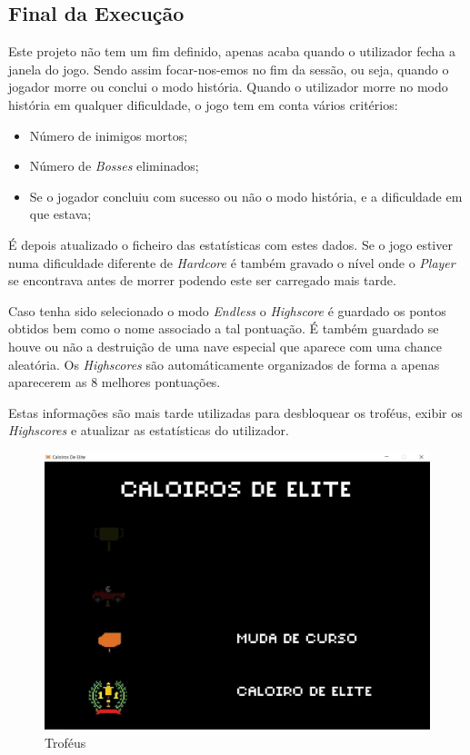 \documentclass[a4paper,11pt]{article}
\newcommand\tab[1][0.8cm]{\hspace*{#1}}
\begin{document}
\subsection{Final da Execução}
\tab Este projeto não tem um fim definido, apenas acaba quando o utilizador fecha a janela do jogo. Sendo assim focar-nos-emos no fim da sessão, ou seja, quando o jogador morre ou conclui o modo história. Quando o utilizador morre no modo história em qualquer dificuldade, o jogo tem em conta vários critérios:
\begin{itemize}
    \item Número de inimigos mortos;
    \item Número de \textit{Bosses} eliminados;
    \item Se o jogador concluiu com sucesso ou não o modo história, e a dificuldade em que estava;
\end{itemize}
É depois atualizado o ficheiro das estatísticas com estes dados. Se o jogo estiver numa dificuldade diferente de \textit{Hardcore} é também gravado o nível onde o \textit{Player} se encontrava antes de morrer podendo este ser carregado mais tarde.

\vspace*{8pt}

Caso tenha sido selecionado o modo \textit{Endless} o \textit{Highscore} é guardado os pontos obtidos bem como o nome associado a tal pontuação. É também guardado se houve ou não a destruição de uma nave especial que aparece com uma chance aleatória. Os \textit{Highscores} são automáticamente organizados de forma a apenas aparecerem as 8 melhores pontuações.

\vspace*{8pt}

Estas informações são mais tarde utilizadas para desbloquear os troféus, exibir os \textit{Highscores} e atualizar as estatísticas	do utilizador.

\vspace*{8pt}

\begin{figure}[H]
    \centering
    \includegraphics[scale = 0.3]{1 - Imagens/trophies.png}
    \caption{Troféus}
    \label{fig:Trophies}
\end{figure}
\end{document}
